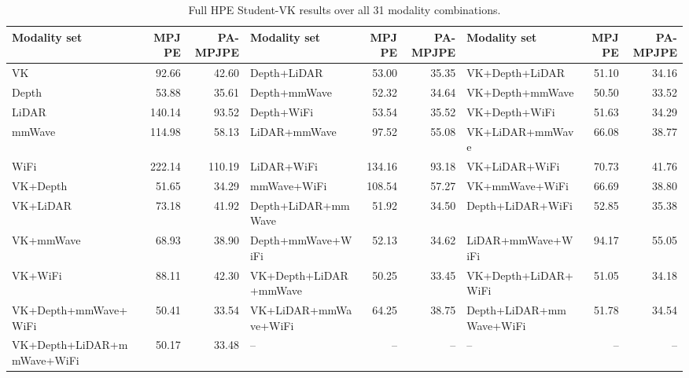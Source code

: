 \documentclass[preprint,12pt]{elsarticle}
\newcommand{\mpjpe}{MPJPE}
\newcommand{\pampjpe}{PA-MPJPE}
\begin{document}
\begin{table}[h]
\centering
\caption{Full HPE Student-VK results over all 31 modality combinations.}
\label{tab:hpe_vk_full_combinations}
\scriptsize
\begin{adjustbox}{width=\textwidth}
\begin{tabular}{lrr|lrr|lrr}
\toprule
Modality set & \mpjpe{} & \pampjpe{} & Modality set & \mpjpe{} & \pampjpe{} & Modality set & \mpjpe{} & \pampjpe{} \\
\midrule
VK & 92.66 & 42.60 & Depth+LiDAR & 53.00 & 35.35 & VK+Depth+LiDAR & 51.10 & 34.16 \\
Depth & 53.88 & 35.61 & Depth+mmWave & 52.32 & 34.64 & VK+Depth+mmWave & 50.50 & 33.52 \\
LiDAR & 140.14 & 93.52 & Depth+WiFi & 53.54 & 35.52 & VK+Depth+WiFi & 51.63 & 34.29 \\
mmWave & 114.98 & 58.13 & LiDAR+mmWave & 97.52 & 55.08 & VK+LiDAR+mmWave & 66.08 & 38.77 \\
WiFi & 222.14 & 110.19 & LiDAR+WiFi & 134.16 & 93.18 & VK+LiDAR+WiFi & 70.73 & 41.76 \\
VK+Depth & 51.65 & 34.29 & mmWave+WiFi & 108.54 & 57.27 & VK+mmWave+WiFi & 66.69 & 38.80 \\
VK+LiDAR & 73.18 & 41.92 & Depth+LiDAR+mmWave & 51.92 & 34.50 & Depth+LiDAR+WiFi & 52.85 & 35.38 \\
VK+mmWave & 68.93 & 38.90 & Depth+mmWave+WiFi & 52.13 & 34.62 & LiDAR+mmWave+WiFi & 94.17 & 55.05 \\
VK+WiFi & 88.11 & 42.30 & VK+Depth+LiDAR+mmWave & 50.25 & 33.45 & VK+Depth+LiDAR+WiFi & 51.05 & 34.18 \\
VK+Depth+mmWave+WiFi & 50.41 & 33.54 & VK+LiDAR+mmWave+WiFi & 64.25 & 38.75 & Depth+LiDAR+mmWave+WiFi & 51.78 & 34.54 \\
VK+Depth+LiDAR+mmWave+WiFi & 50.17 & 33.48 & -- & -- & -- & -- & -- & -- \\
\bottomrule
\end{tabular}
\end{adjustbox}
\end{table}
\end{document}
